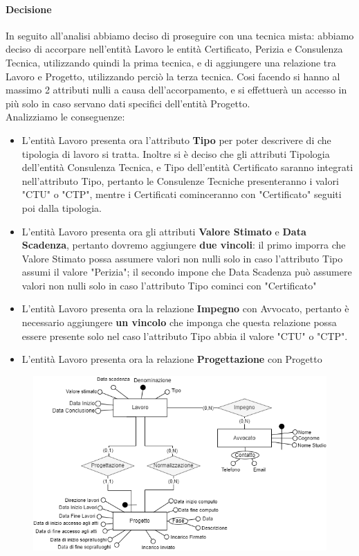 \documentclass{elegantbook}
\begin{document}
			\paragraph{Decisione}
				In seguito all'analisi abbiamo deciso di proseguire con una tecnica mista: abbiamo deciso di accorpare nell'entità Lavoro le entità Certificato, Perizia e Consulenza Tecnica, utilizzando quindi la prima tecnica, e di aggiungere una relazione tra Lavoro e Progetto, utilizzando perciò la terza tecnica. Cosi facendo si hanno al massimo 2 attributi nulli a causa dell'accorpamento, e si effettuerà un accesso in più solo in caso servano dati specifici dell'entità Progetto.
				\\
				Analizziamo le conseguenze:
				\begin{itemize}
					\item L'entità Lavoro presenta ora l'attributo \textbf{Tipo} per poter descrivere di che tipologia di lavoro si tratta. Inoltre si è deciso che gli attributi Tipologia dell'entità Consulenza Tecnica, e Tipo dell'entità Certificato saranno integrati nell'attributo Tipo, pertanto le Consulenze Tecniche presenteranno i valori "CTU" o "CTP", mentre i Certificati cominceranno con "Certificato" seguiti poi dalla tipologia.
					\item L'entità Lavoro presenta ora gli attributi \textbf{Valore Stimato} e \textbf{Data Scadenza}, pertanto dovremo aggiungere \textbf{due vincoli}: il primo imporra che Valore Stimato possa assumere valori non nulli solo in caso l'attributo Tipo assumi il valore "Perizia"; il secondo impone che Data Scadenza può assumere valori non nulli solo in caso l'attributo Tipo cominci con "Certificato"
					\item L'entità Lavoro presenta ora la relazione \textbf{Impegno} con Avvocato, pertanto è necessario aggiungere \textbf{un vincolo} che imponga che questa relazione possa essere presente solo nel caso l'attributo Tipo abbia il valore "CTU" o "CTP".
					\item L'entità Lavoro presenta ora la relazione \textbf{Progettazione} con Progetto
				\end{itemize}
				\begin{figure}[H]
					\centering
					\includegraphics[scale=0.6]{../Img/DBSchemes/Accorpamento-Lavoro.png}
				\end{figure}
		\newpage	
\end{document}
